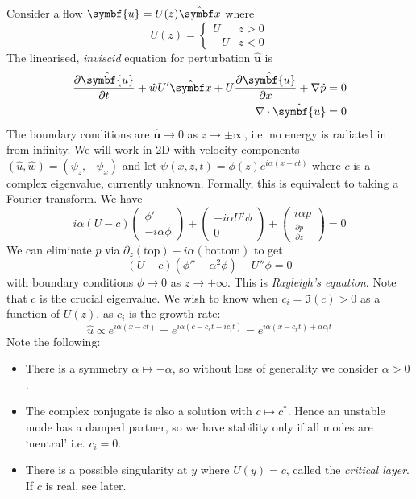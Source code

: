 \documentclass{jknotes}
\renewcommand{\u}{\symbf{u}}
\begin{document}
Consider a flow $\u = U(z)\hat{\x}$ where
\begin{equation}
	U(z) = \begin{cases} U & z > 0 \\ -U & z < 0 \end{cases}
\end{equation}
The linearised, \emph{inviscid} equation for perturbation $\hat{\u}$ is
\begin{align}
	\frac{\partial \hat{\u}}{\partial t} + \hat{w}U'\hat{\x} + U
	\frac{\partial \hat{\u}}{\partial x} + \nabla \hat{p} &= 0 \\
	\nabla \cdot \hat{\u} &= 0 
\end{align}
The boundary conditions are $\hat{\u} \to 0$ as $z \to \pm \infty$, i.e. no
energy is radiated in from infinity. We will work in 2D with velocity
components $(\hat{u},\hat{w}) = (\psi_z, -\psi_x)$ and let $\psi(x,z,t) =
\phi(z) e^{i\alpha(x-ct)}$ where $c$ is a complex eigenvalue, currently
unknown. Formally, this is equivalent to taking a Fourier transform. We have
\begin{equation}
	i\alpha (U-c) \begin{pmatrix} \phi' \\ -i\alpha \phi \end{pmatrix} +
	\begin{pmatrix} -i\alpha U' \phi \\ 0 \end{pmatrix} + \begin{pmatrix} i
\alpha p \\ \frac{\partial p}{\partial z} \end{pmatrix} = 0
\end{equation}
We can eliminate $p$ via $\partial_z (\text{top}) - i\alpha(\text{bottom})$ to
get
\begin{equation}
	(U-c)(\phi''-\alpha^2 \phi) - U'' \phi = 0
\end{equation}
with boundary conditions $\phi \to 0$ as $z \to \pm \infty$. This is
\emph{Rayleigh's equation}. Note that $c$ is the crucial eigenvalue. We wish to
know when $c_i = \Im(c) > 0$ as a function of $U(z)$, as $c_i$ is the growth
rate:
\begin{equation}
	\hat{u} \propto e^{i\alpha(x-ct)} = e^{i\alpha(c-c_r t - i c_i t)} =
		e^{i\alpha(x-c_r t) + \alpha c_i t}
\end{equation}
Note the following:
\begin{itemize}
	\item There is a symmetry $\alpha \mapsto -\alpha$, so without loss of
		generality we consider $\alpha > 0$.
	\item The complex conjugate is also a solution with $c \mapsto c^*$. Hence
		an unstable mode has a damped partner, so we have stability only if
		all modes are `neutral' i.e. $c_i = 0$. 
	\item There is a possible singularity at $y$ where $U(y) = c$, called the
		\emph{critical layer}. If $c$ is real, see later.
\end{itemize}
\end{document}
